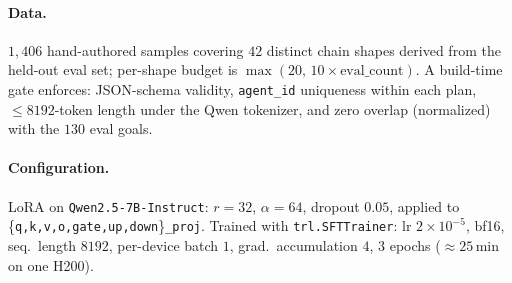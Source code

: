 \paragraph{Data.}
$1{,}406$ hand-authored samples covering $42$ distinct chain shapes
derived from the held-out eval set; per-shape budget is
$\max(20,\,10\!\times\!\text{eval\_count})$. A build-time gate
enforces: JSON-schema validity, \texttt{agent\_id} uniqueness within
each plan, $\le 8192$-token length under the Qwen tokenizer, and
zero overlap (normalized) with the $130$ eval goals.

\paragraph{Configuration.}
LoRA on \texttt{Qwen2.5-7B-Instruct}: $r=32$, $\alpha=64$,
dropout $0.05$, applied to
\{\texttt{q,k,v,o,gate,up,down}\}\texttt{\_proj}.
Trained with \texttt{trl.SFTTrainer}: lr $2\!\times\!10^{-5}$, bf16,
seq.\ length $8192$, per-device batch $1$, grad.\ accumulation $4$,
$3$ epochs ($\approx 25$\,min on one H200).
